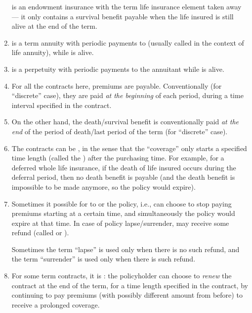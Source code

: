 \begin{enumerate}
\begin{note}
 is an endowment insurance with the term life insurance
element taken away --- it only contains a survival benefit payable when the
life insured is still alive at the end of the term.
\end{note}

\item {} is a term  annuity with periodic
payments  to  (usually called
 in the context of life annuity), while  is alive.

\item {} is a perpetuity with periodic payments
 to the annuitant  while  is
alive.

\item For all the contracts here, premiums  are payable.
Conventionally (for ``discrete'' case), they are paid \emph{at the
beginning} of each period, during a time interval specified in the contract.

\item On the other hand, the death/survival benefit is conventionally paid
\emph{at the end} of the period of death/last period of the term  (for
``discrete'' case).

\item \label{it:deferral} The contracts can be , in the sense
that the ``coverage'' only starts a specified time length (called the
) after the purchasing time. For example, for a deferred
whole life insurance, if the death of life insured  occurs during
the deferral period, then no death benefit is payable (and the death benefit is
impossible to be made anymore, so the policy would expire).

\item Sometimes it possible for  to  or
 the policy, i.e.,  can choose to stop paying
premiums starting at a certain time, and simultaneously the policy would expire
at that time.  In case of policy lapse/surrender,  may receive
some refund (called  or ).

\begin{note}
Sometimes the term ``lapse'' is used only when there is no such refund, and the
term ``surrender'' is used only when there is such refund.
\end{note}

\item For some term contracts, it is : the policyholder
 can choose to \emph{renew} the contract at the end of the term,
for a time length specified in the contract, by continuing to pay premiums
(with possibly different amount from before) to receive a prolonged coverage.
\end{enumerate}
